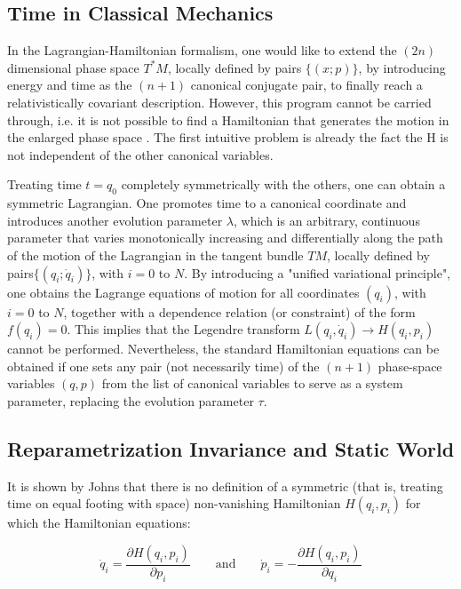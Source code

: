 \documentclass[twoside,a4paper,11pt]{article}
\numberwithin{equation}{section}
\begin{document}
\subsection{Time in Classical Mechanics}

In the Lagrangian-Hamiltonian formalism, one would like to extend the $(2n)$ dimensional phase space $T^*M$, locally defined by pairs $\{(x; p)\}$, by introducing energy and time as the $(n + 1)$ canonical conjugate pair, to finally reach a relativistically covariant description. However, this program cannot be carried through, i.e. it is not possible to find a Hamiltonian that generates the motion in the enlarged phase space \cite{JanNoTimeCoordinate}. The first intuitive problem is already the fact the H is not independent of the other canonical variables. 

Treating time $t = q_0$ completely symmetrically with the others, one can obtain a symmetric Lagrangian. One promotes time to a canonical coordinate and introduces another evolution parameter $\lambda$, which is an arbitrary, continuous parameter that varies monotonically increasing and differentially along the path of the motion of the Lagrangian in the tangent bundle $TM$, locally defined by pairs$\{(q_i; \dot{q}_i)\}$, with $i = 0$ to $N$. By introducing a "unified variational principle", one obtains the Lagrange equations of motion for all coordinates $(q_i)$, with $i = 0$ to $N$, together with a dependence relation (or constraint) of the form $f(q_i) = 0$. This implies that the Legendre transform $L(q_i, \dot{q}_i) \rightarrow H(q_i, p_i)$ cannot be performed. Nevertheless, the standard Hamiltonian equations can be obtained if one sets any pair (not necessarily time) of the $(n + 1)$  phase-space variables $(q, p)$ from the list of canonical variables to serve as a system parameter, replacing the evolution parameter $\tau$.

\subsection{Reparametrization Invariance and Static World}
\label{frozenintime}
It is shown by Johns \cite{noHamiltonian} that there is no definition of a symmetric (that is, treating time on equal footing with space) non-vanishing Hamiltonian $H(q_i, p_i)$ for which the Hamiltonian equations:

\begin{equation}
    \dot{q}_i = \frac{\partial H(q_i,p_i) }{\partial p_i} \qquad \text{and} \qquad  \dot{p}_i = - \frac{\partial H(q_i,p_i) }{\partial q_i}
\end{equation}
\end{document}
